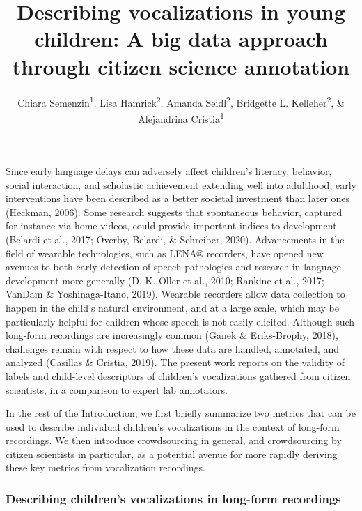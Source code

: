 \documentclass[
  english,
  ,man]{apa6}
\title{Describing vocalizations in young children: A big data approach through citizen science annotation}
\author{Chiara Semenzin\textsuperscript{1}, Lisa Hamrick\textsuperscript{2}, Amanda Seidl\textsuperscript{2}, Bridgette L. Kelleher\textsuperscript{2}, \& Alejandrina Cristia\textsuperscript{1}}
\date{}
\affiliation{\vspace{0.5cm}\textsuperscript{1} Laboratoire de Sciences Cognitives et de Psycholinguistique, Département d'Etudes cognitives, ENS, EHESS, CNRS, PSL University\\\textsuperscript{2} Purdue University}
\begin{document}
\maketitle

Since early language delays can adversely affect children's literacy, behavior, social interaction, and scholastic achievement extending well into adulthood, early interventions have been described as a better societal investment than later ones (Heckman, 2006). Some research suggests that spontaneous behavior, captured for instance via home videos, could provide important indices to development (Belardi et al., 2017; Overby, Belardi, \& Schreiber, 2020). Advancements in the field of wearable technologies, such as LENA® recorders, have opened new avenues to both early detection of speech pathologies and research in language development more generally (D. K. Oller et al., 2010; Rankine et al., 2017; VanDam \& Yoshinaga-Itano, 2019). Wearable recorders allow data collection to happen in the child's natural environment, and at a large scale, which may be particularly helpful for children whose speech is not easily elicited. Although such long-form recordings are increasingly common (Ganek \& Eriks-Brophy, 2018), challenges remain with respect to how these data are handled, annotated, and analyzed (Casillas \& Cristia, 2019). The present work reports on the validity of labels and child-level descriptors of children's vocalizations gathered from citizen scientists, in a comparison to expert lab annotators.

In the rest of the Introduction, we first briefly summarize two metrics that can be used to describe individual children's vocalizations in the context of long-form recordings. We then introduce crowdsourcing in general, and crowdsourcing by citizen scientists in particular, as a potential avenue for more rapidly deriving these key metrics from vocalization recordings.

\hypertarget{describing-childrens-vocalizations-in-long-form-recordings}{%
\subsubsection{Describing children's vocalizations in long-form recordings}\label{describing-childrens-vocalizations-in-long-form-recordings}}
\end{document}
